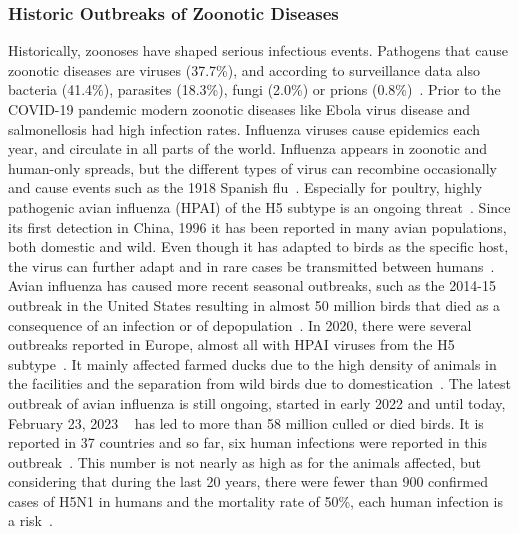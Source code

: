 \subsubsection*{Historic Outbreaks of Zoonotic Diseases}
Historically, zoonoses have shaped serious infectious events. Pathogens that cause zoonotic diseases are viruses (37.7\%), and according to surveillance data also bacteria (41.4\%), parasites (18.3\%), fungi (2.0\%) or prions (0.8\%)~\cite{salyer2017prioritizing}. Prior to the COVID-19 pandemic modern zoonotic diseases like Ebola virus disease and salmonellosis had high infection rates. Influenza viruses cause epidemics each year, and circulate in all parts of the world. Influenza appears in zoonotic and human-only spreads, but the different types of virus can recombine occasionally and cause events such as the 1918 Spanish flu~\cite{garten2009antigenic, gibbs2001recombination}. Especially for poultry, highly pathogenic avian influenza (HPAI) of the H5 subtype is an ongoing threat~\cite{lee2017evolution}. Since its first detection in China, 1996 it has been reported in many avian populations, both domestic and wild. Even though it has adapted to birds as the specific host, the virus can further adapt and in rare cases be transmitted between humans~\cite{webster1992evolution}. Avian influenza has caused more recent seasonal outbreaks, such as the 2014-15 outbreak in the United States resulting in almost 50 million birds that died as a consequence of an infection or of depopulation~\cite{lee2016highly}. In 2020, there were several outbreaks reported in Europe, almost all with HPAI viruses from the H5 subtype~\cite{lewis2021emergence}. It mainly affected farmed ducks due to the high density of animals in the facilities and the separation from wild birds due to domestication~\cite{lewis2021emergence}. The latest outbreak of avian influenza is still ongoing, started in early 2022 and until today, February 23, 2023 ~ has led to more than 58 million culled or died birds. It is reported in 37 countries and so far, six human infections were reported in this outbreak~\cite{authority2023avian}. This number is not nearly as high as for the animals affected, but considering that during the last 20 years, there were fewer than 900 confirmed cases of H5N1 in humans and the mortality rate of 50\%, each human infection is a risk~\cite{authority2023avian}.

